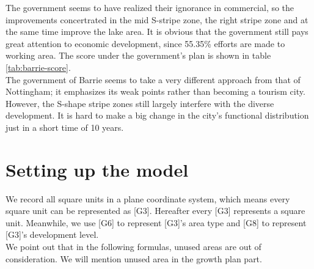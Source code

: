 The government seems to have realized their ignorance in commercial, so the improvements concertrated in the mid S-stripe zone, the right stripe zone and at the same time improve the lake area.
It is obvious that the government still pays great attention to economic development, since 55.35\% efforts are made to working area.
The score under the government's plan is shown in table \ref{tab:barrie-score}.
\\
The government of Barrie seems to take a very different approach from that of Nottingham; it emphasizes its weak points rather than becoming a tourism city.
However, the S-shape stripe zones still largely interfere with the diverse development.
It is hard to make a big change in the city's functional distribution just in a short time of 10 years.


\section{Setting up the model}
We record all square units in a plane coordinate system, which means every square unit can be represented as [G3].
Hereafter every [G3] represents a square unit.
Meanwhile, we use [G6] to represent [G3]'s area type and [G8] to represent [G3]'s development level.
\\
We point out that in the following formulas, unused areas are out of consideration. We will mention unused area in the growth plan part.
\\
